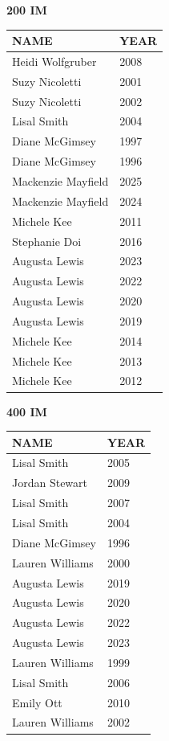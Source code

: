 \begin{table}[H]
\centering
\begin{minipage}[t]{0.48\textwidth}
\centering
\textbf{200 IM}\\[0.1cm]
\begin{tabular}{@{}p{2.8cm}p{1.2cm}@{}}
\hline
    \textbf{NAME} & \textbf{YEAR} \\
\hline
    Heidi Wolfgruber & 2008 \\
    Suzy Nicoletti & 2001 \\
    Suzy Nicoletti & 2002 \\
    Lisal Smith & 2004 \\
    Diane McGimsey & 1997 \\
    Diane McGimsey & 1996 \\
    Mackenzie Mayfield & 2025 \\
    Mackenzie Mayfield & 2024 \\
    Michele Kee & 2011 \\
    Stephanie Doi & 2016 \\
    Augusta Lewis & 2023 \\
    Augusta Lewis & 2022 \\
    Augusta Lewis & 2020 \\
    Augusta Lewis & 2019 \\
    Michele Kee & 2014 \\
    Michele Kee & 2013 \\
    Michele Kee & 2012 \\
\hline
\end{tabular}
\end{minipage}\hfill
\begin{minipage}[t]{0.48\textwidth}
\centering
\textbf{400 IM}\\[0.1cm]
\begin{tabular}{@{}p{2.8cm}p{1.2cm}@{}}
\hline
    \textbf{NAME} & \textbf{YEAR} \\
\hline
    Lisal Smith & 2005 \\
    Jordan Stewart & 2009 \\
    Lisal Smith & 2007 \\
    Lisal Smith & 2004 \\
    Diane McGimsey & 1996 \\
    Lauren Williams & 2000 \\
    Augusta Lewis & 2019 \\
    Augusta Lewis & 2020 \\
    Augusta Lewis & 2022 \\
    Augusta Lewis & 2023 \\
    Lauren Williams & 1999 \\
    Lisal Smith & 2006 \\
    Emily Ott & 2010 \\
    Lauren Williams & 2002 \\
\hline
\end{tabular}
\end{minipage}
\end{table}

